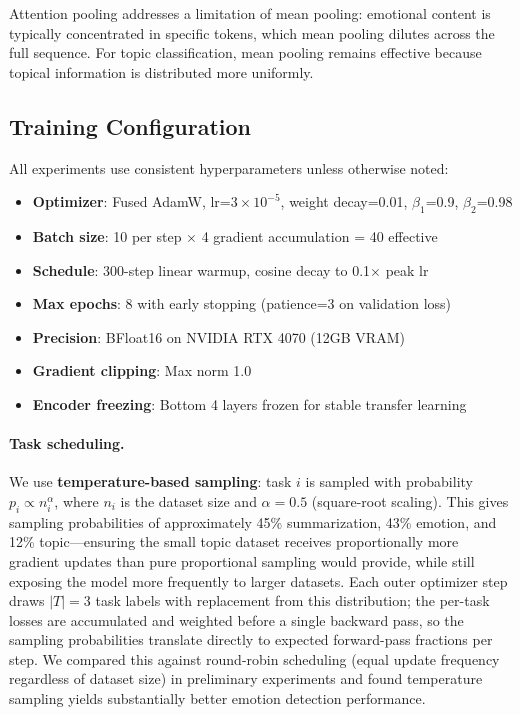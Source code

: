 \documentclass[11pt]{article}
\begin{document}
Attention pooling addresses a limitation of mean pooling: emotional content is typically concentrated in specific tokens, which mean pooling dilutes across the full sequence. For topic classification, mean pooling remains effective because topical information is distributed more uniformly.

\subsection{Training Configuration}

All experiments use consistent hyperparameters unless otherwise noted:

\begin{itemize}
    \item \textbf{Optimizer}: Fused AdamW, lr=$3\times10^{-5}$, weight decay=0.01, $\beta_1$=0.9, $\beta_2$=0.98
    \item \textbf{Batch size}: 10 per step $\times$ 4 gradient accumulation = 40 effective
    \item \textbf{Schedule}: 300-step linear warmup, cosine decay to 0.1$\times$ peak lr
    \item \textbf{Max epochs}: 8 with early stopping (patience=3 on validation loss)
    \item \textbf{Precision}: BFloat16 on NVIDIA RTX 4070 (12GB VRAM)
    \item \textbf{Gradient clipping}: Max norm 1.0
    \item \textbf{Encoder freezing}: Bottom 4 layers frozen for stable transfer learning
\end{itemize}

\paragraph{Task scheduling.} We use \textbf{temperature-based sampling}: task $i$ is sampled with probability $p_i \propto n_i^\alpha$, where $n_i$ is the dataset size and $\alpha = 0.5$ (square-root scaling). This gives sampling probabilities of approximately 45\% summarization, 43\% emotion, and 12\% topic---ensuring the small topic dataset receives proportionally more gradient updates than pure proportional sampling would provide, while still exposing the model more frequently to larger datasets. Each outer optimizer step draws $|T|=3$ task labels with replacement from this distribution; the per-task losses are accumulated and weighted before a single backward pass, so the sampling probabilities translate directly to expected forward-pass fractions per step. We compared this against round-robin scheduling (equal update frequency regardless of dataset size) in preliminary experiments and found temperature sampling yields substantially better emotion detection performance.
\end{document}
